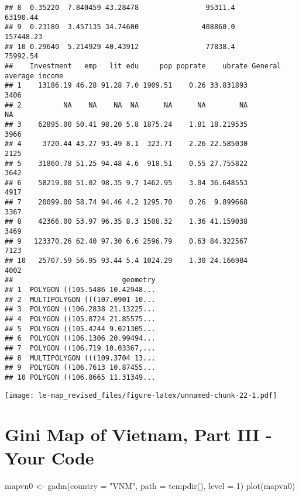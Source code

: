 \documentclass[
]{article}
\newenvironment{Shaded}{\begin{snugshade}}{\end{snugshade}}
\newcommand{\AttributeTok}[1]{\textcolor[rgb]{0.77,0.63,0.00}{#1}}
\newcommand{\DecValTok}[1]{\textcolor[rgb]{0.00,0.00,0.81}{#1}}
\newcommand{\FunctionTok}[1]{\textcolor[rgb]{0.00,0.00,0.00}{#1}}
\newcommand{\NormalTok}[1]{#1}
\newcommand{\OtherTok}[1]{\textcolor[rgb]{0.56,0.35,0.01}{#1}}
\newcommand{\StringTok}[1]{\textcolor[rgb]{0.31,0.60,0.02}{#1}}
\begin{document}
\begin{verbatim}
## 8  0.35220  7.840459 43.28478                95311.4              63190.44
## 9  0.23180  3.457135 34.74600               408860.0             157448.23
## 10 0.29640  5.214929 40.43912                77838.4              75992.54
##    Investment   emp   lit edu     pop poprate    ubrate General average income
## 1    13186.19 46.28 91.28 7.0 1909.51    0.26 33.831893                   3406
## 2          NA    NA    NA  NA      NA      NA        NA                     NA
## 3    62895.00 50.41 98.20 5.8 1875.24    1.81 18.219535                   3966
## 4     3720.44 43.27 93.49 8.1  323.71    2.26 22.585030                   2125
## 5    31860.78 51.25 94.48 4.6  918.51    0.55 27.755822                   3642
## 6    58219.00 51.02 98.35 9.7 1462.95    3.04 36.648553                   4917
## 7    20099.00 58.74 94.46 4.2 1295.70    0.26  9.899668                   3367
## 8    42366.00 53.97 96.35 8.3 1508.32    1.36 41.159038                   3469
## 9   123370.26 62.40 97.30 6.6 2596.79    0.63 84.322567                   7123
## 10   25707.59 56.95 93.44 5.4 1024.29    1.30 24.166984                   4002
##                          geometry
## 1  POLYGON ((105.5486 10.42948...
## 2  MULTIPOLYGON (((107.0901 10...
## 3  POLYGON ((106.2838 21.13225...
## 4  POLYGON ((105.8724 21.85575...
## 5  POLYGON ((105.4244 9.021305...
## 6  POLYGON ((106.1306 20.99494...
## 7  POLYGON ((106.719 10.03367,...
## 8  MULTIPOLYGON (((109.3704 13...
## 9  POLYGON ((106.7613 10.87455...
## 10 POLYGON ((106.8665 11.31349...
\end{verbatim}

\texttt{[image: le-map\_revised\_files/figure-latex/unnamed-chunk-22-1.pdf]}

\hypertarget{gini-map-of-vietnam-part-iii---your-code}{%
\section{Gini Map of Vietnam, Part III - Your
Code}\label{gini-map-of-vietnam-part-iii---your-code}}

\begin{Shaded}
\begin{Highlighting}[]
\NormalTok{mapvn0 }\OtherTok{\textless{}{-}} \FunctionTok{gadm}\NormalTok{(}\AttributeTok{country =} \StringTok{"VNM"}\NormalTok{, }\AttributeTok{path =} \FunctionTok{tempdir}\NormalTok{(), }\AttributeTok{level =} \DecValTok{1}\NormalTok{)}
\FunctionTok{plot}\NormalTok{(mapvn0)}
\end{Highlighting}
\end{Shaded}
\end{document}
